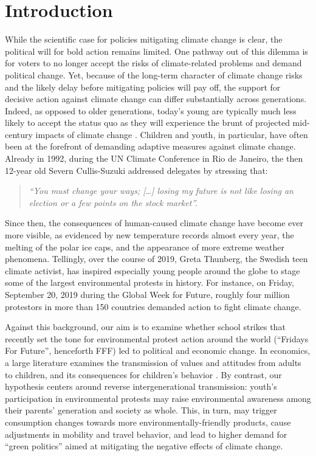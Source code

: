 

\section{Introduction}\label{sec_greta_cons:intro}

While the scientific case for policies mitigating climate change is clear, the political will for bold action remains limited. One pathway out of this dilemma is for voters to no longer accept the risks of climate-related problems and demand political change. Yet, because of the long-term character of climate change risks and the likely delay before mitigating policies will pay off, the support for decisive action against climate change can differ substantially across generations. Indeed, as opposed to older generations, today's young are typically much less likely to accept the status quo as they will experience the brunt of projected mid-century impacts of climate change \citep{hersch2006generational}. Children and youth, in particular, have often been at the forefront of demanding adaptive measures against climate change. Already in 1992, during the UN Climate Conference in Rio de Janeiro, the then 12-year old Severn Cullis-Suzuki addressed delegates by stressing that: 
\begin{quote}
	\textit{“You must change your ways; […] losing my future is not like losing an election or a few points on the stock market”.}
\end{quote}
Since then, the consequences of human-caused climate change have become ever more visible, as evidenced by new temperature records almost every year, the melting of the polar ice caps, and the appearance of more extreme weather phenomena.  Tellingly, over the course of 2019, Greta Thunberg, the Swedish teen climate activist, has inspired especially young people around the globe to stage some of the largest environmental protests in history. For instance, on Friday, September 20, 2019 during the Global Week for Future, roughly four million protestors in more than 150 countries demanded action to fight climate change. 


Against this background, our aim is to examine whether school strikes that recently set the tone for environmental protest action around the world (“Fridays For Future”, henceforth FFF) led to political and economic change. In economics, a large literature examines the transmission of values and attitudes from adults to children, and its consequences for children’s behavior \citep{bisin2001economics,figlio2019longterm}. By contrast, our hypothesis centers around reverse intergenerational transmission: youth's participation in environmental protests may raise environmental awareness among their parents' generation and society as whole. This, in turn, may trigger consumption changes towards more environmentally-friendly products, cause adjustments in mobility and travel behavior, and lead to higher demand for ``green politics'' aimed at mitigating the negative effects of climate change. 

